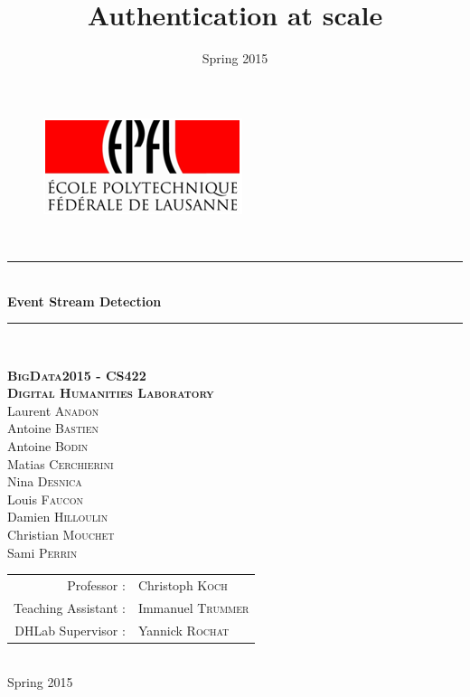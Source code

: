 \documentclass[a4paper, 11pt]{article}
\title{Authentication at scale}
\author{ }
\date{Spring 2015}
\newcommand{\HRule}{\rule{\linewidth}{0.5mm}}
\begin{document}

\begin{titlepage}
\begin{center}

\begin{figure}[h] 
\begin{center}
\begin{minipage}[c]{.45\linewidth}
\begin{center}
\includegraphics[scale=1]{images/logoEPFL.png}
\end{center}
\end{minipage}
\end{center}
\end{figure}

\hfill \\[2cm]
\HRule \\[0.5cm]
{ \Huge \bfseries Event Stream Detection}\\[0.5cm]

\HRule \\[2cm]
\makeatletter
\renewcommand{\thesection}{\@arabic\c@section}
\makeatother

 
    
\textsc{\textbf{\Large BigData2015 - CS422\\ Digital Humanities Laboratory}}\\[2cm]


\large Laurent \textsc{Anadon}\\
\large Antoine \textsc{Bastien}\\
\large Antoine \textsc{Bodin}\\
\large Matias \textsc{Cerchierini}\\
\large Nina \textsc{Desnica}\\
\large Louis \textsc{Faucon}\\
\large Damien \textsc{Hilloulin}\\
\large Christian \textsc{Mouchet}\\
\large Sami \textsc{Perrin}\\[2cm]


\begin{tabular}{rl}
Professor : &Christoph \textsc{Koch}\\
Teaching Assistant : &Immanuel \textsc{Trummer}\\
DHLab Supervisor : &Yannick \textsc{Rochat}
\end{tabular}

\hfill \\[1cm]
{\large Spring 2015}
\end{center}
\end{titlepage}
\end{document}
